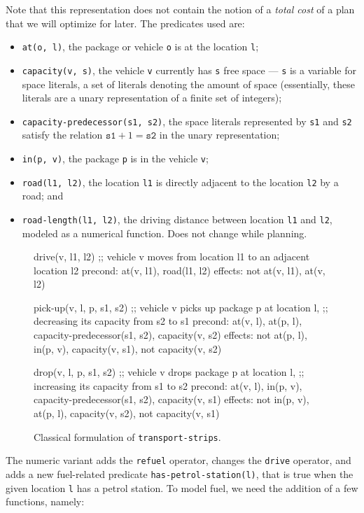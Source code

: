 Note that this representation does not contain the notion of a \textit{total cost}
of a plan that we will optimize for later.
The predicates used are:
\begin{itemize}
\item \verb+at(o, l)+, the package or vehicle \verb+o+ is at the
location \verb+l+;
\item \verb+capacity(v, s)+, the vehicle \verb+v+ currently has \verb+s+ free space --- \verb+s+ is a variable for space literals, a set of literals denoting the amount of space (essentially,
these literals are a unary representation of a finite set of integers);
\item \verb+capacity-predecessor(s1, s2)+, the space literals represented by \verb+s1+ and \verb+s2+
satisfy the relation $\texttt{s1} + 1 = \texttt{s2}$
in the unary representation;
\item \verb+in(p, v)+, the package \verb+p+ is in the vehicle \verb+v+;
\item \verb+road(l1, l2)+, the location \verb+l1+ is directly adjacent to the location
\verb+l2+ by a road; and
\item \verb+road-length(l1, l2)+, the driving distance between location \verb+l1+
and \verb+l2+, modeled as a numerical function. Does not change while planning.
\end{itemize}

\begin{figure}[tbp]
\begin{code}
drive(v, l1, l2)
  ;; vehicle v moves from location l1 to an adjacent location l2
  precond: at(v, l1), road(l1, l2)
  effects: not at(v, l1), at(v, l2)

pick-up(v, l, p, s1, s2)
  ;; vehicle v picks up package p at location l,
  ;; decreasing its capacity from s2 to s1
  precond: at(v, l), at(p, l), capacity-predecessor(s1, s2),
           capacity(v, s2)
  effects: not at(p, l), in(p, v), capacity(v, s1),
           not capacity(v, s2)
  
drop(v, l, p, s1, s2)
  ;; vehicle v drops package p at location l,
  ;; increasing its capacity from s1 to s2
  precond: at(v, l), in(p, v), capacity-predecessor(s1, s2),
           capacity(v, s1)
  effects: not in(p, v), at(p, l), capacity(v, s2),
           not capacity(v, s1)
\end{code}
\caption{Classical formulation of \texttt{transport-strips}.}
\label{code:classical-strips}
\end{figure}

The numeric variant  adds the \verb+refuel+ operator, changes the \verb+drive+
operator, and adds a new fuel-related predicate \verb+has-petrol-station(l)+, that is true when the given location \verb+l+ has
a petrol station.
To model fuel, we need the addition of a few functions, namely:

